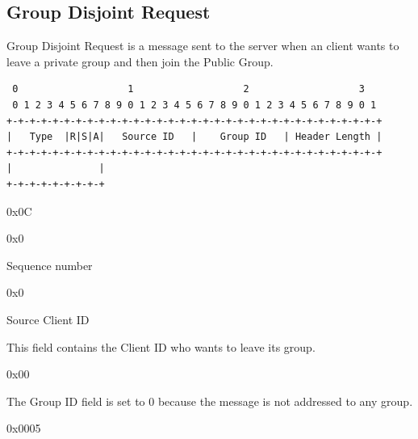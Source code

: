 \documentclass{article}
\begin{document}
\subsection{Group Disjoint Request}
Group Disjoint Request is a message sent to the server when an client wants to leave a private group and then join the Public Group.
\begin{verbatim}  
 0                   1                   2                   3  
 0 1 2 3 4 5 6 7 8 9 0 1 2 3 4 5 6 7 8 9 0 1 2 3 4 5 6 7 8 9 0 1
+-+-+-+-+-+-+-+-+-+-+-+-+-+-+-+-+-+-+-+-+-+-+-+-+-+-+-+-+-+-+-+-+
|   Type  |R|S|A|   Source ID   |    Group ID   | Header Length |
+-+-+-+-+-+-+-+-+-+-+-+-+-+-+-+-+-+-+-+-+-+-+-+-+-+-+-+-+-+-+-+-+
|               |
+-+-+-+-+-+-+-+-+
\end{verbatim}
\begin{description}[align=left]
    \item [Type:] 0x0C
    
    \item [Reserved:] 0x0
        
    \item [Sequence:] Sequence number
    
    \item [Acknowledgement:] 0x0
    
    \item [Source ID:] Source Client ID
    \begin{flushleft}
        This field contains the Client ID who wants to leave its group.
    \end{flushleft}
    
    \item [Group ID:] 0x00
    \begin{flushleft}
        The Group ID field is set to 0 because the message is not addressed to any group.
    \end{flushleft}
    
    \item [Header Length:] 0x0005
  
\end{description}
\end{document}
